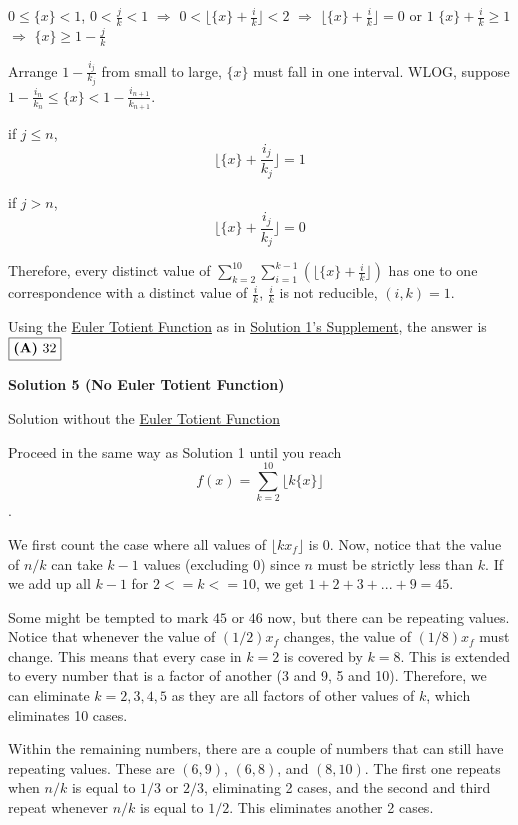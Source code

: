\begin{enumerate}
$0 \le \{ x \} < 1$, $0 < \frac{j}{k}<1$ $\Longrightarrow$ $0 < \lfloor \{ x \} + \frac{i}{k} \rfloor < 2$ $\Longrightarrow$ $\lfloor \{ x \} + \frac{i}{k} \rfloor = 0 \text{ or } 1$
$\{ x \} + \frac{i}{k} \ge 1$ $\Longrightarrow$ $\{ x \} \ge 1 - \frac{j}{k}$

 Arrange $1 - \frac{i_j}{k_j}$ from small to large, $\{ x \}$ must fall in one interval. WLOG, suppose $1 - \frac{i_n}{k_n} \le \{ x \} < 1- \frac{i_{n+1}}{k_{n+1}}$.

 if $j \le n$, 
 \[\lfloor \{ x \} + \frac{i_j}{k_j} \rfloor = 1\]

 if $j > n$, 
 \[\lfloor \{ x \} + \frac{i_j}{k_j} \rfloor = 0\]

 Therefore, every distinct value of $\sum_{k=2}^{10}\sum_{i=1}^{k-1}( \lfloor \{ x \} + \frac{i}{k} \rfloor)$ has one to one correspondence with a distinct value of $\frac{i}{k}$, $\frac{i}{k}$ is not reducible, $(i, k) = 1$.

 Using the \href{https://artofproblemsolving.com/wiki/index.php?title=Euler\_Totient\_Function}{Euler Totient Function} as in \href{https://artofproblemsolving.com/wiki/index.php?title=2016\_AMC\_10B\_Problems/Problem\_25\#Supplement}{Solution 1's Supplement}, the answer is $\fbox{\textbf{(A)}\ 32}$




\textbf{Solution 5 (No Euler Totient Function)}

Solution without the \href{https://artofproblemsolving.com/wiki/index.php?title=Euler\_Totient\_Function}{Euler Totient Function}

 Proceed in the same way as Solution 1 until you reach 
 \[f(x) = \sum_{k=2}^{10} \lfloor k \{ x \} \rfloor\].

 We first count the case where all values of $\lfloor kx_f \rfloor$ is 0. Now, notice that the value of $n/k$ can take $k-1$ values (excluding 0) since $n$ must be strictly less than $k$. If we add up all $k-1$ for $2<=k<=10$, we get $1+2+3+...+9 = 45$. 

 Some might be tempted to mark $45$ or $46$ now, but there can be repeating values. Notice that whenever the value of $(1/2)x_f$ changes, the value of $(1/8)x_f$ must change. This means that every case in $k=2$ is covered by $k=8$. This is extended to every number that is a factor of another (3 and 9, 5 and 10). Therefore, we can eliminate $k=2,3,4,5$ as they are all factors of other values of $k$, which eliminates 10 cases. 

 Within the remaining numbers, there are a couple of numbers that can still have repeating values. These are $(6, 9)$, $(6, 8)$, and $(8,10)$. The first one repeats when $n/k$ is equal to $1/3$ or $2/3$, eliminating 2 cases, and the second and third repeat whenever $n/k$ is equal to $1/2$. This eliminates another 2 cases.


\end{enumerate}
